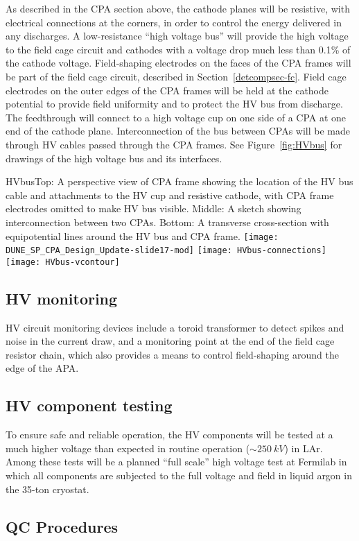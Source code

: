 As described in the CPA section above, the cathode planes will be
resistive, with electrical connections at the corners, in order to
control the energy delivered in any discharges.  A low-resistance
``high voltage bus'' will provide the high voltage to the field cage
circuit and cathodes with a voltage drop much less than 0.1\% of the
cathode voltage.  Field-shaping electrodes on the faces of the CPA
frames will be part of the field cage circuit, described in Section~\ref{detcompsec-fc}. %
Field cage electrodes on the outer edges of the
CPA frames will be held at the cathode potential to provide field
uniformity and to protect the HV bus from discharge.  The feedthrough
will connect to a high voltage cup on one side of a CPA at one end of
the cathode plane.  Interconnection of the bus between CPAs will be made
through HV cables passed through the CPA frames.  See
Figure~\ref{fig:HVbus} for drawings of the high voltage bus and its
interfaces.

\begin{cdrfigure}{HVbus}{Top: A perspective view of CPA frame showing the location of the HV bus cable and attachments to the HV cup and resistive cathode, with CPA frame electrodes omitted to make HV bus visible. Middle: A sketch showing interconnection between two CPAs. Bottom: A transverse cross-section with equipotential lines around the HV bus and CPA frame.}
\texttt{[image: DUNE\_SP\_CPA\_Design\_Update-slide17-mod]}
\texttt{[image: HVbus-connections]}
\texttt{[image: HVbus-vcontour]}
\end{cdrfigure}


\subsection{HV monitoring}

HV circuit monitoring devices include a toroid transformer to detect
spikes and noise in the current draw, and a monitoring point at the end
of the field cage resistor chain, which also provides a means to
control field-shaping around the edge of the
APA.

\subsection{HV component testing}

To ensure safe and reliable operation, the HV components will be
tested at a much higher voltage than expected in routine operation
($\sim\SI{250}{kV}$) in LAr. Among these tests will be a planned
``full scale'' high voltage test at Fermilab in which all components
are subjected to the full voltage and field in liquid argon in the
35-ton cryostat. 

\subsection{QC Procedures}

